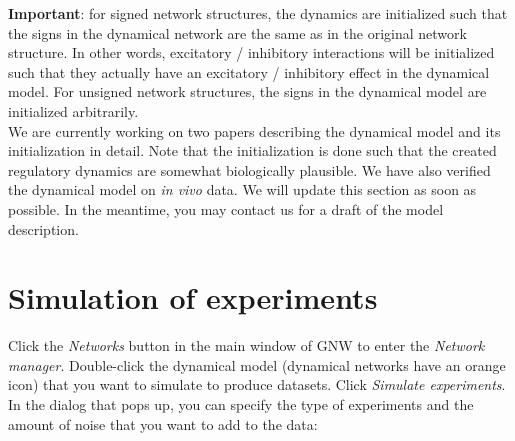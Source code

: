 \documentclass{llncs}
\newcommand{\invivo}{\emph{in vivo }}
\begin{document}
\textbf{Important}: for signed network structures, the dynamics are initialized such that the signs in the dynamical network are the same as in the original network structure. In other words, excitatory / inhibitory interactions will be initialized such that they actually have an excitatory / inhibitory effect in the dynamical model. For unsigned network structures, the signs in the dynamical model are initialized arbitrarily.\\

We are currently working on two papers describing the dynamical model and its initialization in detail. Note that the initialization is done such that the created regulatory dynamics are somewhat biologically plausible. We have also verified the dynamical model on \invivo data. We will update this section as soon as possible. In the meantime, you may contact us for a draft of the model description.\\



\section{Simulation of experiments}
\label{experiments}

Click the \emph{Networks} button in the main window of GNW to enter the \emph{Network manager}. Double-click the dynamical model (dynamical networks have an orange icon) that you want to simulate to produce datasets. Click \emph{Simulate experiments}. In the dialog that pops up, you can specify the type of experiments and the amount of noise that you want to add to the data:
\end{document}
